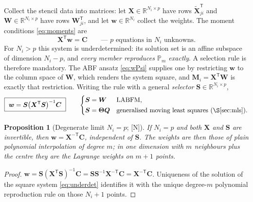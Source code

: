 \documentclass[11pt,a4paper]{article}
\newcommand{\New}{\textcolor{blue!60!black}{\textsf{[N]}}}
\newtheorem{proposition}{Proposition}
\begin{document}
Collect the stencil data into matrices: let $\bm X\in\mathbb R^{N_i\times p}$ have rows
$\widetilde{\bm X}_{ji}^{\mathsf T}$ and $\bm W\in\mathbb R^{N_i\times p}$ have rows
$\bm W_{ji}^{\mathsf T}$, and let $\bm w\in\mathbb R^{N_i}$ collect the weights. The
moment conditions \eqref{eq:moments} are
\begin{equation}
\bm X^{\mathsf T}\bm w=\bm C
\qquad\text{---\ $p$ equations in $N_i$ unknowns.}
\label{eq:underdet}
\end{equation}
For $N_i>p$ this system is underdetermined: its solution set is an affine subspace of
dimension $N_i-p$, and \emph{every member reproduces $\mathbb P_m$ exactly}. A
selection rule is therefore mandatory. The ABF ansatz \eqref{eq:wPsi} supplies one by
restricting $\bm w$ to the column space of $\bm W$, which renders the system square,
and $\bm M_i=\bm X^{\mathsf T}\bm W$ is exactly that restriction. Writing the rule with
a general \emph{selector} $\bm S\in\mathbb R^{N_i\times p}$,
\begin{equation}
\boxed{\ \bm w=\bm S\bigl(\bm X^{\mathsf T}\bm S\bigr)^{-1}\bm C\ }
\qquad
\begin{cases}
\bm S=\bm W & \text{LABFM},\\[0.15em]
\bm S=\bm\Theta\bm Q & \text{generalised moving least squares (\S\ref{sec:mls})}.
\end{cases}
\label{eq:selector}
\end{equation}

\begin{proposition}[Degenerate limit $N_i=p$; \New]
\label{prop:degenerate}
If $N_i=p$ and both $\bm X$ and $\bm S$ are invertible, then
$\bm w=\bm X^{-\mathsf T}\bm C$, independent of $\bm S$. The weights are then those of
plain polynomial interpolation of degree $m$; in one dimension with $m$ neighbours plus
the centre they are the Lagrange weights on $m+1$ points.
\end{proposition}
\begin{proof}
$\bm w=\bm S(\bm X^{\mathsf T}\bm S)^{-1}\bm C=\bm S\bm S^{-1}\bm X^{-\mathsf T}\bm C
=\bm X^{-\mathsf T}\bm C$. Uniqueness of the solution of the square system
\eqref{eq:underdet} identifies it with the unique degree-$m$ polynomial reproduction
rule on those $N_i+1$ points.
\end{proof}
\end{document}
